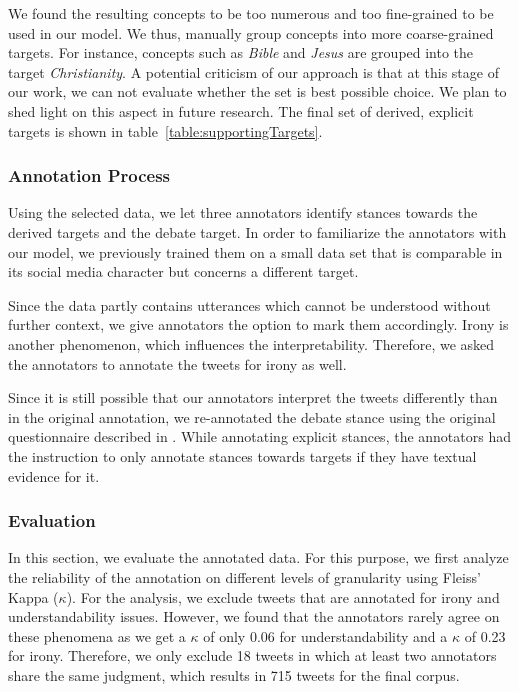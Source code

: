 \documentclass[11pt]{article}
\begin{document}
We found the resulting concepts to be too numerous and too fine-grained to be used in our model.
We thus, manually group concepts into more coarse-grained targets.
For instance, concepts such as \textit{Bible} and \textit{Jesus} are grouped into the target \textit{Christianity}.
A potential criticism of our approach is that at this stage of our work, we can not evaluate whether the set is best possible choice.
We plan to shed light on this aspect in future research. 
The final set of derived, explicit targets is shown in table~\ref{table:supportingTargets}.

\subsubsection{Annotation Process}
Using the selected data, we let three annotators identify stances towards the derived targets and the debate target.
In order to familiarize the annotators with our model, we previously trained them on a small data set that is comparable in its social media character but concerns a different target. 

Since the data partly contains utterances which cannot be understood without further context, we give annotators the option to mark them accordingly. 
Irony is another phenomenon, which influences the interpretability.
Therefore, we asked the annotators to annotate the tweets for irony as well.

Since it is still possible that our annotators interpret the tweets differently than in the original annotation, we re-annotated the debate stance using the original questionnaire described in .
While annotating explicit stances, the annotators had the instruction to only annotate stances towards targets if they have textual evidence for it.


\subsubsection{Evaluation}
In this section, we evaluate the annotated data.
For this purpose, we first analyze the reliability of the annotation on different levels of granularity using Fleiss' Kappa ($\kappa$).
For the analysis, we exclude tweets that are annotated for irony and understandability issues.
However, we found that the annotators rarely agree on these phenomena as we get a $\kappa$ of only 0.06 for understandability and a $\kappa$ of 0.23 for irony.
Therefore, we only exclude 18 tweets in which at least two annotators share the same judgment, which results in 715 tweets for the final corpus.
\end{document}
